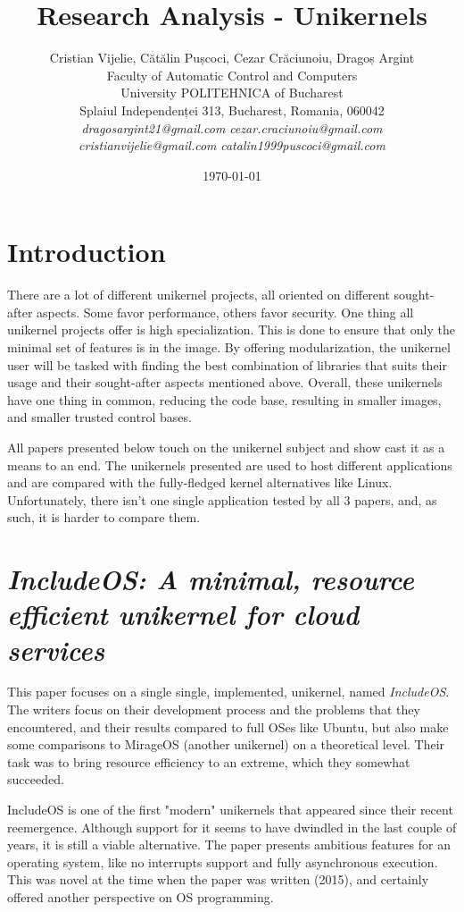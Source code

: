 \documentclass[12pt]{article}
\title{Research Analysis - Unikernels}
\author{Cristian Vijelie, Cătălin Pușcoci, Cezar Crăciunoiu, Dragoș Argint\\
Faculty of Automatic Control and Computers\\
University POLITEHNICA of Bucharest\\
Splaiul Independenței 313, Bucharest, Romania, 060042 \\
\emph{dragosargint21@gmail.com} \emph{cezar.craciunoiu@gmail.com} \\
\emph{cristianvijelie@gmail.com} \emph{catalin1999puscoci@gmail.com}}
\date{\today}
\begin{document}
\maketitle

\section{Introduction}
There are a lot of different unikernel projects, all oriented on different sought-after aspects. Some favor performance,
others favor security. One thing all unikernel projects offer is high specialization. This is done to ensure that only the minimal
set of features is in the image. By offering modularization, the unikernel user will be tasked with finding the best combination of
libraries that suits their usage and their sought-after aspects mentioned above. Overall, these unikernels have one thing in common,
reducing the code base, resulting in smaller images, and smaller trusted control bases.

All papers presented below touch on the unikernel subject and show cast it as a means to an end. The unikernels presented are used
to host different applications and are compared with the fully-fledged kernel alternatives like Linux. Unfortunately, there isn't one
single application tested by all 3 papers, and, as such, it is harder to compare them. 

\section{\emph{IncludeOS: A minimal, resource efficient unikernel for cloud services}}
This paper\cite{article1} focuses on a single single, implemented, unikernel, named \emph{IncludeOS}. The writers focus on their development
process and the problems that they encountered, and their results compared to full OSes like Ubuntu, but also make some comparisons to MirageOS
(another unikernel) on a theoretical level. Their task was to bring resource efficiency to an extreme, which they somewhat succeeded.

IncludeOS is one of the first "modern" unikernels that appeared since their recent reemergence. Although support for it seems to have
dwindled in the last couple of years, it is still a viable alternative. The paper presents ambitious features for an operating system,
like no interrupts support and fully asynchronous execution. This was novel at the time when the paper was written (2015), and certainly
offered another perspective on OS programming.
\end{document}

